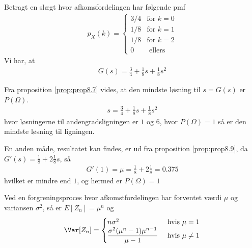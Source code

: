 \begin{exmp} %
    Betragt en slægt hvor afkomsfordelingen har følgende pmf
    \begin{align*}
        p_X(k) = \begin{cases}
                    3/4  & \text{for } k = 0 \\
                    1/8  & \text{for } k = 1 \\
                    1/8  & \text{for } k = 2 \\
                    0 & \text{ ellers}
                \end{cases}
    \end{align*}
Vi har, at 
\begin{align*}
    G(s)=\frac{3}{4}+\frac{1}{8}s+\frac{1}{8}s^2
\end{align*}

Fra proposition \ref{prop:prop8.7} vides, at den mindste løsning til $s=G(s)$ er $P(\Omega)$.
\begin{align*}
    s=\frac{3}{4}+\frac{1}{8}s+\frac{1}{8}s^2
\end{align*}
hvor løsningerne til andengradsligningen er $1$ og $6$, hvor $P(\Omega)=1$ så er den mindste løsning til ligningen. 

En anden måde, resultatet kan findes, er ud fra proposition \ref{prop:prop8.9}, da $G'(s)=\frac{1}{8}+2\frac{1}{8}s$, så 
\begin{align*}
    G'(1)=\mu=\frac{1}{8}+2\frac{1}{8}=0.375
\end{align*}
hvilket er mindre end $1$, og hermed er $P(\Omega)=1$
\end{exmp}


\begin{prop} %
Ved en forgreningsproces hvor afkomstfordelingen har forventet værdi $\mu$ og variansen $\sigma^2$, så er $E[Z_n]=\mu^n$ og
    \begin{equation*}
        \Var[Z_n] = \begin{cases} 
        n\sigma^2 & \text{ hvis } \mu =1\\
        \dfrac{\sigma^2(\mu^n-1)\mu^{n-1}}{\mu-1} & \text{ hvis } \mu \neq 1
        \end{cases}
    \end{equation*}
\end{prop}

